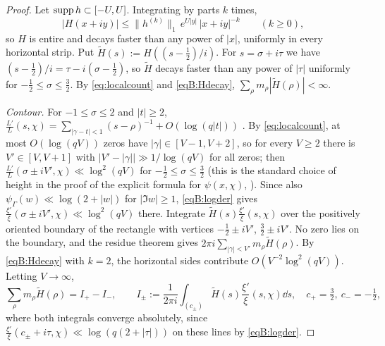 \documentclass[11pt]{amsart}
\theoremstyle{definition}
\theoremstyle{remark}
\numberwithin{equation}{section}
\begin{document}
\begin{proof}
Let $\operatorname{supp} h\subset[-U,U]$. Integrating by parts $k$ times,
\begin{equation}\label{eqB:Hdecay}
|H(x+iy)|\le\|h^{(k)}\|_1\,e^{U|y|}\,|x+iy|^{-k}\qquad(k\ge0),
\end{equation}
so $H$ is entire and decays faster than any power of $|x|$, uniformly in every horizontal strip. Put $\widetilde H(s):=H((s-\frac12)/i)$. For $s=\sigma+i\tau$ we have $(s-\frac12)/i=\tau-i(\sigma-\frac12)$, so $\widetilde H$ decays faster than any power of $|\tau|$ uniformly for $-\frac12\le\sigma\le\frac32$. By \eqref{eq:localcount} and \eqref{eqB:Hdecay}, $\sum_\rho m_\rho|\widetilde H(\rho)|<\infty$.

\emph{Contour.} For $-1\le\sigma\le2$ and $|t|\ge2$, $\frac{L'}L(s,\chi)=\sum_{|\gamma-t|<1}(s-\rho)^{-1}+O(\log(q|t|))$ \cite[Ch.~16]{Dav}. By \eqref{eq:localcount}, at most $O(\log(qV))$ zeros have $|\gamma|\in[V-1,V+2]$, so for every $V\ge2$ there is $V'\in[V,V+1]$ with $\big|V'-|\gamma|\big|\gg1/\log(qV)$ for all zeros; then $\frac{L'}L(\sigma\pm iV',\chi)\ll\log^2(qV)$ for $-\frac12\le\sigma\le\frac32$ (this is the standard choice of height in the proof of the explicit formula for $\psi(x,\chi)$, \cite[Ch.~19]{Dav}). Since also $\psi_\Gamma(w)\ll\log(2+|w|)$ for $|\Im w|\ge1$, \eqref{eqB:logder} gives $\frac{\xi'}\xi(\sigma\pm iV',\chi)\ll\log^2(qV)$ there. Integrate $\widetilde H(s)\frac{\xi'}\xi(s,\chi)$ over the positively oriented boundary of the rectangle with vertices $-\frac12\pm iV'$, $\frac32\pm iV'$. No zero lies on the boundary, and the residue theorem gives $2\pi i\sum_{|\gamma|<V'}m_\rho\widetilde H(\rho)$. By \eqref{eqB:Hdecay} with $k=2$, the horizontal sides contribute $O(V^{-2}\log^2(qV))$. Letting $V\to\infty$,
\begin{equation}\label{eqB:IpIm}
\sum_\rho m_\rho\widetilde H(\rho)=I_+-I_-,\qquad I_\pm:=\frac1{2\pi i}\int_{(c_\pm)}\widetilde H(s)\frac{\xi'}\xi(s,\chi)\dd s,\quad c_+=\tfrac32,\ c_-=-\tfrac12,
\end{equation}
where both integrals converge absolutely, since $\frac{\xi'}\xi(c_\pm+i\tau,\chi)\ll\log(q(2+|\tau|))$ on these lines by \eqref{eqB:logder}.


\end{proof}
\end{document}
